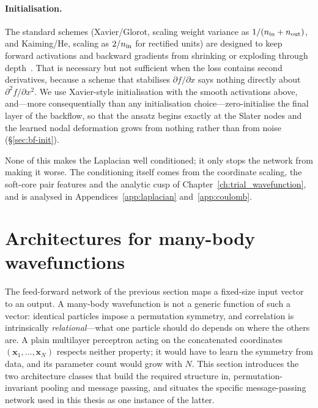 \paragraph{Initialisation.}
The standard schemes (Xavier/Glorot, scaling weight variance as $1/(n_{\rm in}+n_{\rm out})$, and Kaiming/He, scaling as $2/n_{\rm in}$ for rectified units) are designed to keep
forward activations and backward gradients from shrinking or exploding through
depth~\cite{GlorotBengio2010-Xavier,HeEtAl2015-KaimingInit}. That is necessary but not
sufficient when the loss contains second derivatives, because a scheme that stabilises
$\partial f/\partial x$ says nothing directly about $\partial^2 f/\partial x^2$. We use
Xavier-style initialisation with the smooth activations above, and---more consequentially
than any initialisation choice---zero-initialise the final layer of the backflow, so that
the ansatz begins exactly at the Slater nodes and the learned nodal deformation grows from
nothing rather than from noise (\S\ref{sec:bf-init}).

None of this makes the Laplacian well conditioned; it only stops the network from making
it worse. The conditioning itself comes from the coordinate scaling, the soft-core pair
features and the analytic cusp of Chapter~\ref{ch:trial_wavefunction}, and is analysed in
Appendices~\ref{app:laplacian} and~\ref{app:coulomb}.


\section{Architectures for many-body wavefunctions}
\label{sec:architectures}

The feed-forward network of the previous section maps a fixed-size input vector to an
output. A many-body wavefunction is not a generic function of such a vector: identical
particles impose a permutation symmetry, and correlation is intrinsically
\emph{relational}---what one particle should do depends on where the others are. A plain
multilayer perceptron acting on the concatenated coordinates
$(\mathbf x_1,\dots,\mathbf x_N)$ respects neither property; it would have to learn the
symmetry from data, and its parameter count would grow with $N$. This section introduces
the two architecture classes that build the required structure in, permutation-invariant pooling and message passing, and situates the specific message-passing network used in
this thesis as one instance of the latter.

